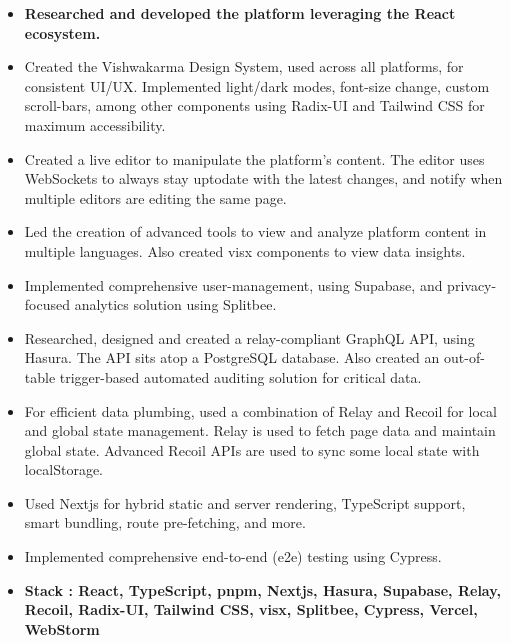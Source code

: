 \documentclass[10pt,a4paper,ragged2e,withhyper]{altacv}
\begin{document}
\tagline{}

\makecvheader



\begin{paracol}{2}


\begin{itemize}
\item \textbf{Researched and developed the platform leveraging the React ecosystem.}
\item Created the Vishwakarma Design System, used across all platforms, for consistent UI/UX. Implemented light/dark modes, font-size change, custom scroll-bars, among other components using Radix-UI and Tailwind CSS for maximum accessibility. 
\item Created a live editor to manipulate the platform's content. The editor uses WebSockets to always stay uptodate with the latest changes, and notify when multiple editors are editing the same page.
\item Led the creation of advanced tools to view and analyze platform content in multiple languages. Also created visx components to view data insights.
\item Implemented comprehensive user-management, using Supabase, and privacy-focused analytics solution using Splitbee. 
\item Researched, designed and created a relay-compliant GraphQL API, using Hasura. The API sits atop a PostgreSQL database. Also created an out-of-table trigger-based automated auditing solution for critical data.
\item For efficient data plumbing, used a combination of Relay and Recoil for local and global state management. Relay is used to fetch page data and maintain global state. Advanced Recoil APIs are used to sync some local state with localStorage.
\item Used Nextjs for hybrid static and server rendering, TypeScript support, smart bundling, route pre-fetching, and more.
\item Implemented comprehensive end-to-end (e2e) testing using Cypress.
\item \textbf{Stack : React, TypeScript, pnpm, Nextjs, Hasura, Supabase, Relay, Recoil, Radix-UI, Tailwind CSS, visx, Splitbee, Cypress, Vercel, WebStorm}
\end{itemize}


\end{paracol}
\end{document}
